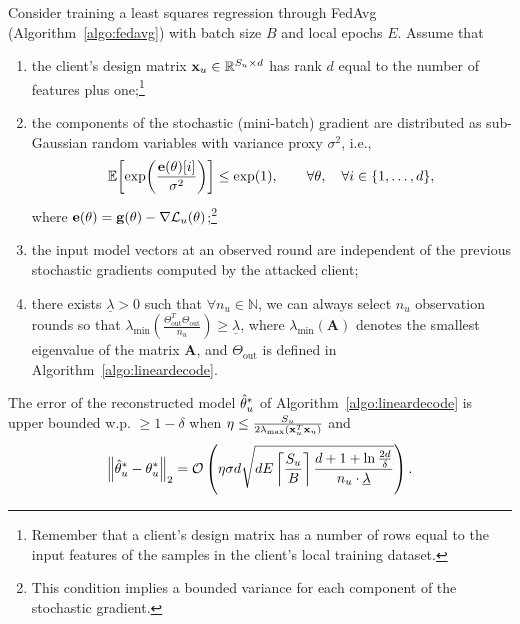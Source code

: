\begin{savenotes}
\begin{theorem}\label{prop:stochastic_case}
Consider training a least squares regression through FedAvg (Algorithm~\ref{algo:fedavg}) with batch size $B$ and local epochs $E$. Assume that 
\begin{enumerate}
    \item the client's design matrix ${\mathbf{x}}_u\in \mathbb{R}^{S_u\times d}$ has rank $d$ equal to the number of features plus one;\footnote{Remember that a client's design matrix has a number of rows equal to the input features of the samples in the client's local training dataset.}
    \item the components of the stochastic (mini-batch) gradient are distributed as sub-Gaussian random variables with variance proxy $\sigma^2$, i.e.,
    \[
        \mathbb{E}\!\left[\exp\!\left(\frac{\mathbf{e}(\theta)[i]}{\sigma^2}\right)\right]
        \leq \exp(1),
        \qquad \forall \theta,\quad \forall i\in\{1,\dots,d\},
    \]
    where $\mathbf{e}(\theta) = \mathbf{g}(\theta) - \nabla {\ensuremath{\mathcal{L}}_u}(\theta)$;\footnote{This condition implies a bounded variance for each component of the stochastic gradient.}
\item the input model vectors at an observed round are independent of the previous stochastic gradients computed by the attacked client;
\item there exists $\underline{\lambda}>0$ such that $\forall n_u \in \mathbb{N}$, we can always select $n_u$ observation rounds so that $\lambda_{\min}\!\left(\frac{\Theta_{\text{out}}^{T} \Theta_{\text{out}}}{n_u}\right) \ge \underline{\lambda}$, where $\lambda_{\min}(\mathbf{A})$ denotes the smallest eigenvalue of the matrix $\mathbf{A}$, and $\Theta_{\text{out}}$ is defined in Algorithm~\ref{algo:lineardecode}.
\end{enumerate}
The error of the reconstructed model $\hat{\theta}^*_u$ of Algorithm~\ref{algo:lineardecode} is upper bounded w.p.  $\ge 1-\delta$  when $\eta\leq \frac{S_u}{2\lambda_{\max}({\mathbf{x}}_u^T{\mathbf{x}}_u)}$ and
\begin{equation}
   \left\lVert \hat{\theta}^*_u - \theta_u^* \right\rVert_2 = \mathcal{O}\left(\eta\sigma d\sqrt{ d E\left\lceil\frac{S_u}{B}\right\rceil \frac{d+1+\ln \frac{2d}{\delta}}{n_u \cdot \underline{\lambda}}} \right). 
\end{equation}
\end{theorem}
\end{savenotes}


